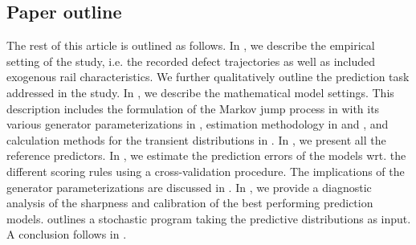 \subsection{Paper outline}
The rest of this article is outlined as follows. In , we describe the empirical setting of the study, i.e. the recorded defect trajectories as well as included exogenous rail characteristics. We further qualitatively outline the prediction task addressed in the study. In , we describe the mathematical model settings. This description includes the formulation of the Markov jump process in  with its various generator parameterizations in , estimation methodology in  and , and calculation methods for the transient distributions in . In , we present all the reference predictors. In , we estimate the prediction errors of the models wrt. the different scoring rules using a cross-validation procedure. The implications of the generator parameterizations are discussed in . In , we provide a diagnostic analysis of the sharpness and calibration of the best performing prediction models.  outlines a stochastic program taking the predictive distributions as input. A conclusion follows in . 